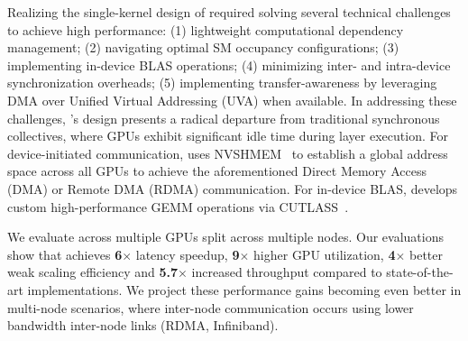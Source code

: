 Realizing the single-kernel design of \sysname required
solving several technical challenges to achieve high performance:
(1) lightweight computational dependency management; (2)
navigating optimal SM occupancy configurations; (3) implementing in-device BLAS operations;
(4) minimizing inter- and intra-device synchronization overheads; (5) implementing transfer-awareness by leveraging
DMA over Unified Virtual Addressing (UVA) when available.
In addressing these challenges, \sysname's design presents a
radical departure from traditional synchronous \alltoall collectives,
where GPUs exhibit significant idle time during layer execution.
For device-initiated communication,
\sysname uses NVSHMEM~\cite{nvshm} to establish a global address space across all GPUs to
achieve the aforementioned Direct Memory Access (DMA) or Remote DMA (RDMA) communication.
For in-device BLAS, \sysname develops custom high-performance GEMM operations via CUTLASS~\cite{Thakkar_CUTLASS_2023}.

We evaluate \sysname across multiple GPUs split across multiple nodes.
Our evaluations show that \sysname achieves \textbf{6}$\times$ latency speedup,
\textbf{9}$\times$ higher GPU utilization, \textbf{4}$\times$ better weak scaling efficiency and \textbf{5.7}$\times$
increased throughput compared to state-of-the-art implementations.
We project these performance gains becoming even better in multi-node scenarios,
where inter-node communication occurs using lower bandwidth inter-node links (\eg RDMA, Infiniband).
